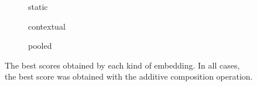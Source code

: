 \begin{figure}
  \centering
  \begin{subfigure}[b]{\textwidth}
    \centering
    \caption{static}
  \end{subfigure}
  \par\bigskip\par\bigskip
  \begin{subfigure}[b]{\textwidth}
    \centering
    \caption{contextual}
  \end{subfigure}
  \par\bigskip\par\bigskip
  \begin{subfigure}[b]{\textwidth}
    \centering
    \caption{pooled}
  \end{subfigure}
  \caption{The best scores obtained by each kind of embedding.
    In all cases, the best score was obtained with the additive composition operation.
  }
  \label{table:best-score}
\end{figure}
